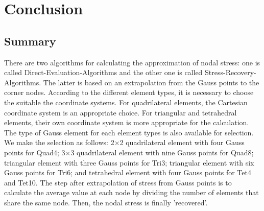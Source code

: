 \chapter{Conclusion}
\section{Summary}
There are two algorithms for calculating the approximation of nodal stress: one is called Direct-Evaluation-Algorithms and the other one is called Stress-Recovery-Algorithms. The latter is based on an extrapolation from the Gauss points to the corner nodes. According to the different element types, it is necessary to choose the suitable the coordinate systems. For quadrilateral elements, the Cartesian coordinate system is an appropriate choice. For triangular and tetrahedral elements, their own coordinate system is more appropriate for the calculation. The type of Gauss element for each element types is also available for selection. We make the selection as follows: 2$\times$2 quadrilateral element with four Gauss points for Quad4; 3$\times$3 quadrilateral element with nine Gauss points for Quad8; triangular element with three Gauss points for Tri3; triangular element with six Gauss points for Tri6; and tetrahedral element with four Gauss points for Tet4 and Tet10. The step after extrapolation of stress from Gauss points is to calculate the average value at each node by dividing the number of elements that share the same node. Then, the nodal stress is finally 'recovered'. 

